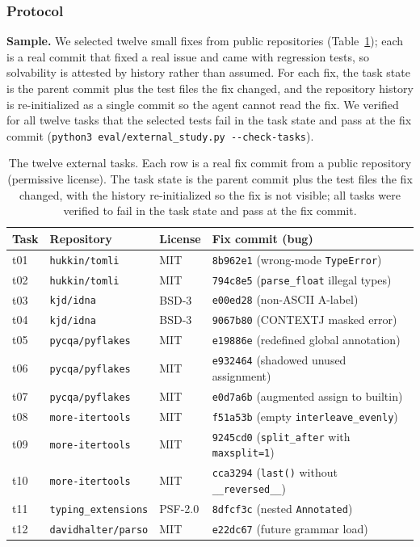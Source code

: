 \documentclass[11pt]{article}
\begin{document}
\subsubsection{Protocol}

\textbf{Sample.} We selected twelve small fixes from public repositories
(Table~\ref{tab:external-tasks}); each is a real commit that fixed a real
issue and came with regression tests, so solvability is attested by history
rather than assumed. For each fix, the task state is the parent commit plus
the test files the fix changed, and the repository history is
re-initialized as a single commit so the agent cannot read the fix. We
verified for all twelve tasks that the selected tests fail in the task
state and pass at the fix commit (\texttt{python3
eval/external\_study.py -{}-check-tasks}).

\begin{table}[!ht]
\caption{The twelve external tasks. Each row is a real fix commit from a
public repository (permissive license). The task state is the parent
commit plus the test files the fix changed, with the history
re-initialized so the fix is not visible; all tasks were verified to fail
in the task state and pass at the fix commit.}
\centering
\footnotesize
\begin{tabular}{@{}llll@{}}
\toprule
Task & Repository & License & Fix commit (bug) \\
\midrule
t01 & \texttt{hukkin/tomli} & MIT & \texttt{8b962e1} (wrong-mode \texttt{TypeError}) \\
t02 & \texttt{hukkin/tomli} & MIT & \texttt{794c8e5} (\texttt{parse\_float} illegal types) \\
t03 & \texttt{kjd/idna} & BSD-3 & \texttt{e00ed28} (non-ASCII A-label) \\
t04 & \texttt{kjd/idna} & BSD-3 & \texttt{9067b80} (CONTEXTJ masked error) \\
t05 & \texttt{pycqa/pyflakes} & MIT & \texttt{e19886e} (redefined global annotation) \\
t06 & \texttt{pycqa/pyflakes} & MIT & \texttt{e932464} (shadowed unused assignment) \\
t07 & \texttt{pycqa/pyflakes} & MIT & \texttt{e0d7a6b} (augmented assign to builtin) \\
t08 & \texttt{more-itertools} & MIT & \texttt{f51a53b} (empty \texttt{interleave\_evenly}) \\
t09 & \texttt{more-itertools} & MIT & \texttt{9245cd0} (\texttt{split\_after} with \texttt{maxsplit=1}) \\
t10 & \texttt{more-itertools} & MIT & \texttt{cca3294} (\texttt{last()} without \texttt{\_\_reversed\_\_}) \\
t11 & \texttt{typing\_extensions} & PSF-2.0 & \texttt{8dfcf3c} (nested \texttt{Annotated}) \\
t12 & \texttt{davidhalter/parso} & MIT & \texttt{e22dc67} (future grammar load) \\
\bottomrule
\end{tabular}
\label{tab:external-tasks}
\end{table}
\end{document}
